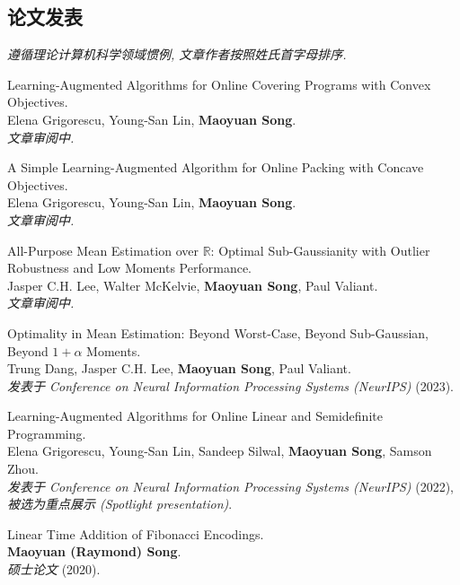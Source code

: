 \documentclass[margin, 10pt]{res} %
\begin{document}
\begin{resume}
\section{论文发表}
{\it 遵循理论计算机科学领域惯例, 文章作者按照姓氏首字母排序.}
\begin{etaremune}
\item Learning-Augmented Algorithms for Online Covering Programs with Convex Objectives.\\
Elena Grigorescu, Young-San Lin, {\bf Maoyuan Song}.\\
\emph{文章审阅中.}
\item A Simple Learning-Augmented Algorithm for Online Packing with Concave Objectives.\\
Elena Grigorescu, Young-San Lin, {\bf Maoyuan Song}.\\
\emph{文章审阅中.}
\item All-Purpose Mean Estimation over $\mathbb{R}$: Optimal Sub-Gaussianity with Outlier Robustness and Low Moments Performance.\\
Jasper C.H. Lee, Walter McKelvie, {\bf Maoyuan Song}, Paul Valiant.\\
\emph{文章审阅中.}
\item Optimality in Mean Estimation: Beyond Worst-Case, Beyond Sub-Gaussian, Beyond $1 + \alpha$ Moments.\\
Trung Dang, Jasper C.H. Lee, {\bf Maoyuan Song}, Paul Valiant.\\
\emph{发表于 Conference on Neural Information Processing Systems (NeurIPS)} (2023).
\item Learning-Augmented Algorithms for Online Linear and Semidefinite Programming.\\
Elena Grigorescu, Young-San Lin, Sandeep Silwal, {\bf Maoyuan Song}, Samson Zhou.\\
\emph{发表于 Conference on Neural Information Processing Systems (NeurIPS)} (2022), \emph{被选为重点展示 (Spotlight presentation)}.
\item Linear Time Addition of Fibonacci Encodings.\\
{\bf Maoyuan (Raymond) Song}.\\
\emph{硕士论文} (2020).
\end{etaremune}


\end{resume}
\end{document}
